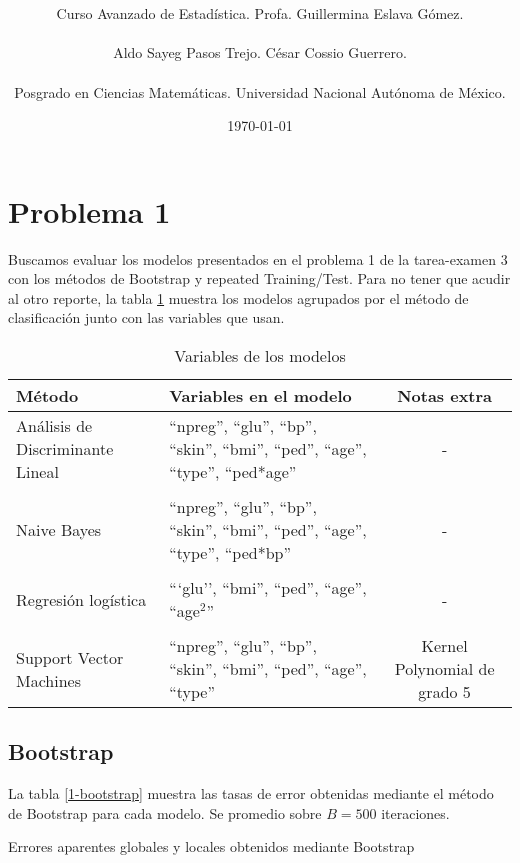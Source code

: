 \documentclass[11pt]{article}
\title{\textbf{\work}}
\author{Curso Avanzado de Estadística. Profa. Guillermina Eslava Gómez.\\ \\ Aldo Sayeg Pasos Trejo. César Cossio Guerrero. \\ \\ Posgrado en Ciencias Matemáticas. Universidad Nacional Autónoma de México. }
\date{\today}
\begin{document}
\maketitle
\section{Problema 1}
Buscamos evaluar los modelos presentados en el problema 1 de la tarea-examen 3 con los métodos de Bootstrap y repeated Training/Test. Para no tener que acudir al otro reporte, la tabla \ref{1-var} muestra los modelos agrupados por el método de clasificación junto con las variables que usan.
\begin{table}[H]
    \centering
    \begin{tabular}{p{3cm}|p{7cm} | c}
        Método & Variables en el modelo & Notas extra\\
        \hline
        Análisis de Discriminante Lineal & ``npreg'', ``glu'', ``bp'', ``skin'', ``bmi'', ``ped'', ``age'', ``type'', ``ped*age'' & -\\
        & & \\
        Naive Bayes & ``npreg'', ``glu'', ``bp'', ``skin'', ``bmi'', ``ped'', ``age'', ``type'', ``ped*bp'' & -\\
        & & \\
        Regresión logística & ```glu'', ``bmi'', ``ped'',  ``age'',  ``age$^2$'' & - \\
        & & \\
        Support Vector Machines & ``npreg'', ``glu'', ``bp'', ``skin'', ``bmi'', ``ped'', ``age'', ``type'' & Kernel Polynomial de grado 5 \\
    \end{tabular}
    \caption{Variables de los modelos}
    \label{1-var}
\end{table}
\subsection{Bootstrap}
La tabla \ref{1-bootstrap} muestra las tasas de error obtenidas mediante el método de Bootstrap para cada modelo. Se promedio sobre $B=500$ iteraciones.
\begin{table}[H]
    \centering
    
    \caption{Errores aparentes globales y locales obtenidos mediante Bootstrap}
    \label{1-bootstrap}
\end{table}
\end{document}

